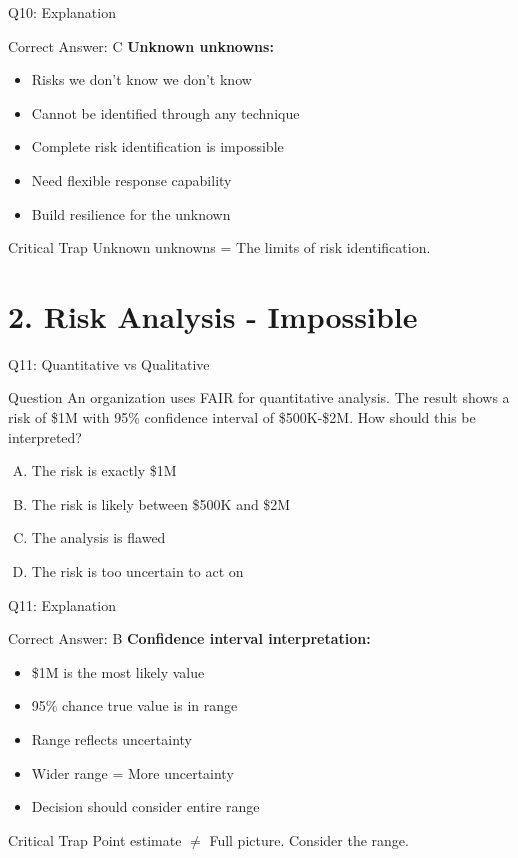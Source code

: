 \documentclass{beamer}
\begin{document}
			\begin{frame}{Q10: Explanation}
				\begin{block}{Correct Answer: C}
					\textbf{Unknown unknowns:}
					\begin{itemize}
						\item Risks we don't know we don't know
						\item Cannot be identified through any technique
						\item Complete risk identification is impossible
						\item Need flexible response capability
						\item Build resilience for the unknown
					\end{itemize}
				\end{block}
				\begin{alertblock}{Critical Trap}
					Unknown unknowns = The limits of risk identification.
				\end{alertblock}
			\end{frame}
			
			\section{2. Risk Analysis - Impossible}
			\begin{frame}{Q11: Quantitative vs Qualitative}
				\begin{block}{Question}
					An organization uses FAIR for quantitative analysis. The result shows a risk of \$1M with 95\% confidence interval of \$500K-\$2M. How should this be interpreted?
				\end{block}
				\begin{enumerate}[(A)]
					\item The risk is exactly \$1M
					\item The risk is likely between \$500K and \$2M
					\item The analysis is flawed
					\item The risk is too uncertain to act on
				\end{enumerate}
			\end{frame}
			
			\begin{frame}{Q11: Explanation}
				\begin{block}{Correct Answer: B}
					\textbf{Confidence interval interpretation:}
					\begin{itemize}
						\item \$1M is the most likely value
						\item 95\% chance true value is in range
						\item Range reflects uncertainty
						\item Wider range = More uncertainty
						\item Decision should consider entire range
					\end{itemize}
				\end{block}
				\begin{alertblock}{Critical Trap}
					Point estimate $\neq$ Full picture. Consider the range.
				\end{alertblock}
			\end{frame}
			
\end{document}
